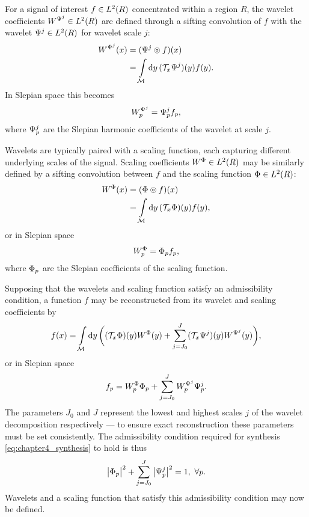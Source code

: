 For a signal of interest \(f \in L^{2}(R)\) concentrated within a region \(R\), the wavelet coefficients \(W^{\Psi^{j}} \in L^{2}(R)\) are defined through a sifting convolution of \(f\) with the wavelet \(\Psi^{j} \in L^{2}(R)\) for wavelet scale \(j\):
%
\begin{align}
	W^{\Psi^{j}}(x)
	 & = (\Psi^{j} \circledcirc{} f)(x) \nonumber                         \\
	 & = \int\limits_{\mathcal{M}} \dd{y} (\mathcal{T}_{x}\Psi^{j})(y) f(y).
\end{align}
%
In Slepian space this becomes
%
\begin{equation}\label{eq:chapter4_slepian_wavelet_p}
	{W}_{p}^{\Psi^{j}}
	= {\Psi}_{p}^{j} {f}_{p},
\end{equation}
%
where \({\Psi}_{p}^{j}\) are the Slepian harmonic coefficients of the wavelet at scale \(j\).

Wavelets are typically paired with a scaling function, each capturing different underlying scales of the signal.
Scaling coefficients \(W^{\Phi} \in L^{2}(R)\) may be similarly defined by a sifting convolution between \(f\) and the scaling function \(\Phi \in L^{2}(R)\):
%
\begin{align}
	W^{\Phi}(x)
	 & = (\Phi \circledcirc{} f)(x) \nonumber                         \\
	 & = \int\limits_{\mathcal{M}} \dd{y} (\mathcal{T}_{x}\Phi)(y) f(y),
\end{align}
%
or in Slepian space
%
\begin{equation}\label{eq:chapter4_slepian_scaling_p}
	{W}_{p}^{\Phi}
	= {\Phi}_{p} {f}_{p},
\end{equation}
%
where \({\Phi}_{p}\) are the Slepian coefficients of the scaling function.

Supposing that the wavelets and scaling function satisfy an admissibility condition, a function \(f\) may be reconstructed from its wavelet and scaling coefficients by
%
\begin{equation}\label{eq:chapter4_synthesis}
	f(x)
	= \int\limits_{\mathcal{M}} \dd{y} \bigg(
	(\mathcal{T}_{x}\Phi)(y) W^{\Phi}(y)
	+ \sum\limits_{j=J_{0}}^{J} (\mathcal{T}_{x}\Psi^{j})(y) W^{\Psi^{j}}(y)
	\bigg),
\end{equation}
%
or in Slepian space
%
\begin{equation}
	{f}_{p}
	= {W}_{p}^{\Phi} {\Phi}_{p}
	+ \sum\limits_{j=J_{0}}^{J} {W}_{p}^{\Psi^{j}} {\Psi}_{p}^{j}.
\end{equation}
%
The parameters \(J_{0}\) and \(J\) represent the lowest and highest scales \(j\) of the wavelet decomposition respectively --- to ensure exact reconstruction these parameters must be set consistently.
The admissibility condition required for synthesis \cref{eq:chapter4_synthesis} to hold is thus
%
\begin{equation}\label{eq:chapter4_admissibility}
	\big\lvert{\Phi}_{p}\big\rvert^{2}
	+ \sum\limits_{j=J_{0}}^{J} \big\lvert{\Psi}_{p}^{j}\big\rvert^{2}
	= 1,\ \forall p.
\end{equation}
%
Wavelets and a scaling function that satisfy this admissibility condition may now be defined.

